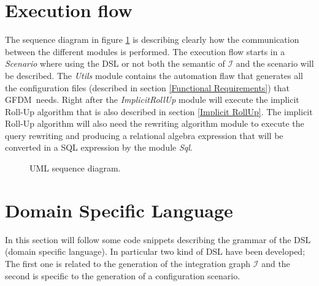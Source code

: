 \documentclass[12pt,a4paper]{report}
\newcommand\systemName{GFDM}
\newcommand\integrationGraph{\mathcal{I}}
\begin{document}
\section{Execution flow}
The sequence diagram in figure \ref{fig:Sequence} is describing clearly how the communication between the different modules is performed.
%
The execution flow starts in a \textit{Scenario} where using the DSL or not both the semantic of $\integrationGraph$ and the scenario will be described.
%
The \textit{Utils} module contains the automation flaw that generates all the configuration files (described in section \ref{Functional Requirements}) that \systemName\, needs.
%
Right after the \textit{ImplicitRollUp} module will execute the implicit Roll-Up algorithm that is also described in section \ref{Implicit RollUp}.
%
The implicit Roll-Up algorithm will also need the rewriting algorithm module to execute the query rewriting and producing a relational algebra expression that will be converted in a SQL expression by the module \textit{Sql}.
%
\begin{figure} [ht]
    \caption{UML sequence diagram.}
    \label{fig:Sequence}
\end{figure}
%


\section{Domain Specific Language} \label{Domain Specific Language}
In this section will follow some code snippets describing the grammar of the DSL (domain specific language).
%
In particular two kind of DSL have been developed; The first one is related to the generation of the integration graph $\integrationGraph$ and the second is specific to the generation of a configuration scenario.
\end{document}
